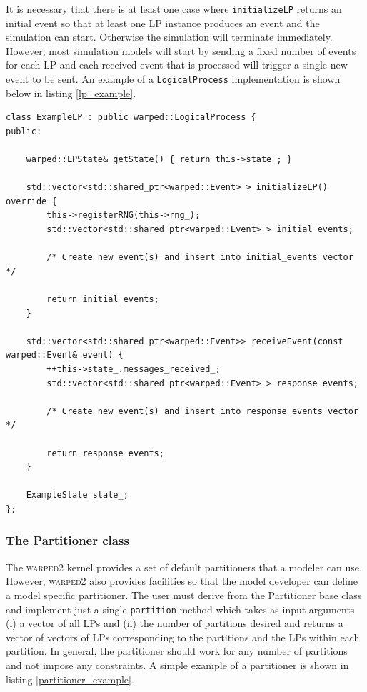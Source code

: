 \documentclass[11pt]{book}
\begin{document}
\noindent
It is necessary that there is at least one case where \texttt{initializeLP} returns an initial event
so that at least one LP instance produces an event and the simulation can start.  Otherwise the
simulation will terminate immediately. However, most simulation models will start by sending a fixed
number of events for each LP and each received event that is processed will trigger a single new
event to be sent. An example of a \texttt{LogicalProcess} implementation is shown below in listing
\ref{lp_example}.

\begin{lstlisting}[caption=Example \textsc{warped2} LogicalProcess Definition, label=lp_example, float]
class ExampleLP : public warped::LogicalProcess {
public:

    warped::LPState& getState() { return this->state_; }

    std::vector<std::shared_ptr<warped::Event> > initializeLP() override {
        this->registerRNG(this->rng_);
        std::vector<std::shared_ptr<warped::Event> > initial_events;

        /* Create new event(s) and insert into initial_events vector */

        return initial_events;
    }

    std::vector<std::shared_ptr<warped::Event>> receiveEvent(const warped::Event& event) {
        ++this->state_.messages_received_;
        std::vector<std::shared_ptr<warped::Event> > response_events;

        /* Create new event(s) and insert into response_events vector */

        return response_events;
    }

    ExampleState state_;
};
\end{lstlisting}

\subsubsection{The Partitioner class}\label{partitioner}

The \textsc{warped2} kernel provides a set of default partitioners that a modeler can use.  However,
\textsc{warped2} also provides facilities so that the model developer can define a model specific
partitioner.  The user must derive from the Partitioner base class and implement just a single
\texttt{partition} method which takes as input arguments (i) a vector of all LPs and (ii) the number
of partitions desired and returns a vector of vectors of LPs corresponding to the partitions and the
LPs within each partition.  In general, the partitioner should work for any number of partitions and
not impose any constraints.  A simple example of a partitioner is shown in listing
\ref{partitioner_example}.
\end{document}
